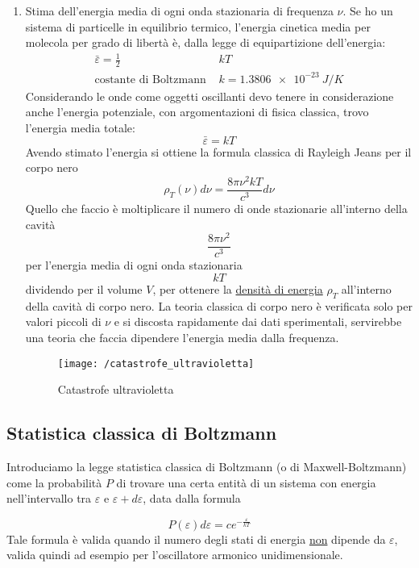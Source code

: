 \begin{enumerate}[label=\Roman{*}.]
\item Stima dell'energia media di ogni onda stazionaria di frequenza $\nu$.
Se ho un sistema di particelle in equilibrio termico, l'energia cinetica media per molecola per grado di libertà è, dalla legge di equipartizione dell'energia:
\begin{equation}
\begin{split}
\bar \varepsilon = \frac{ 1}{2 } & k T \\
\mbox{costante di Boltzmann } & k = \SI{1.3806e-23}{J/K}
\end{split}
\end{equation}
Considerando le onde come oggetti oscillanti devo tenere in considerazione anche l'energia potenziale, con argomentazioni di fisica classica, trovo l'energia media totale:
\begin{equation}
\bar \varepsilon = k T
\end{equation}
Avendo stimato l'energia si ottiene la formula classica di Rayleigh Jeans per il corpo nero 
\begin{equation}
\rho_T(\nu)d\nu = \frac{8 \pi \nu^2 k T }{c^3}d\nu
\end{equation}
Quello che faccio è moltiplicare il numero di onde stazionarie all'interno della cavità 
$$\frac{8 \pi \nu^2}{c^3}$$
per l'energia media di ogni onda stazionaria
$$kT$$
dividendo per il volume $V$, per ottenere la \underline{densità di energia} $\rho_T$ all'interno della cavità di corpo nero.
La teoria classica di corpo nero è verificata solo per valori piccoli di $\nu$ e si discosta rapidamente dai dati sperimentali, servirebbe una teoria che faccia dipendere l'energia media dalla frequenza.
\begin{figure}[h]
\centering
\texttt{[image: /catastrofe\_ultravioletta]}
\caption{Catastrofe ultravioletta}
\end{figure}

\end{enumerate}

\subsection{Statistica classica di Boltzmann}
Introduciamo la legge statistica classica di Boltzmann (o di Maxwell-Boltzmann) come la probabilità $P$ di trovare una certa entità di un sistema con energia nell'intervallo tra $\varepsilon$ e $\varepsilon+d\varepsilon$, data dalla formula

\begin{equation}
P(\varepsilon)d\varepsilon = c e^{ -\frac{\varepsilon}{kT } }
\end{equation}
Tale formula è valida quando il numero degli stati di energia \underline{non} dipende da $\varepsilon$, valida quindi ad esempio per l'oscillatore armonico unidimensionale.

